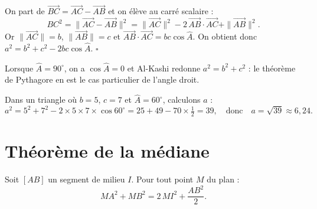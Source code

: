 \begin{illus}
\end{illus}

\begin{aretenir}[Démonstration]
On part de $\vec{BC}=\vec{AC}-\vec{AB}$ et on élève au carré scalaire :
\[ BC^2=\|\vec{AC}-\vec{AB}\|^2=\|\vec{AC}\|^2-2\,\vec{AB}\cdot\vec{AC}+\|\vec{AB}\|^2. \]
Or $\|\vec{AC}\|=b$, $\|\vec{AB}\|=c$ et
$\vec{AB}\cdot\vec{AC}=bc\cos\widehat{A}$. On obtient donc
$a^2=b^2+c^2-2bc\cos\widehat{A}$. \hfill$\square$
\end{aretenir}

\begin{remarque}
Lorsque $\widehat{A}=90^\circ$, on a $\cos\widehat{A}=0$ et Al-Kashi redonne
$a^2=b^2+c^2$ : le théorème de Pythagore en est le cas particulier de l'angle droit.
\end{remarque}

\begin{exemple}
Dans un triangle où $b=5$, $c=7$ et $\widehat{A}=60^\circ$, calculons $a$ :
\[ a^2=5^2+7^2-2\times5\times7\times\cos 60^\circ=25+49-70\times\tfrac12=39,
   \quad\text{donc}\quad a=\sqrt{39}\approx 6{,}24. \]
\end{exemple}

\section{Théorème de la médiane}

\begin{theoreme}
Soit $[AB]$ un segment de milieu $I$. Pour tout point $M$ du plan :
\[ MA^2+MB^2=2\,MI^2+\frac{AB^2}{2}. \]
\end{theoreme}

